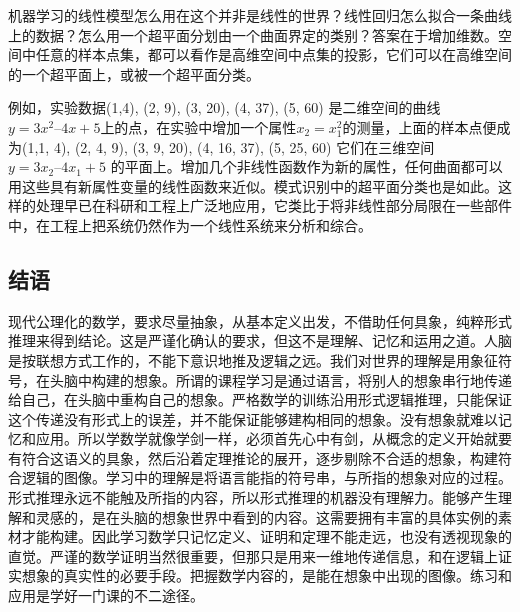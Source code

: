 机器学习的线性模型怎么用在这个并非是线性的世界？线性回归怎么拟合一条曲线上的数据？怎么用一个超平面分划由一个曲面界定的类别？答案在于增加维数。空间中任意的样本点集，都可以看作是高维空间中点集的投影，它们可以在高维空间的一个超平面上，或被一个超平面分类。

例如，实验数据(1,4), (2, 9), (3, 20), (4, 37), (5, 60) 是二维空间的曲线 $ y = 3x^2 – 4x + 5 $上的点，在实验中增加一个属性$ x_2 = x_1^2 $的测量，上面的样本点便成为(1,1, 4), (2, 4, 9), (3, 9, 20), (4, 16, 37), (5, 25, 60) 它们在三维空间$ y =3x_2 – 4x_1 + 5 $ 的平面上。增加几个非线性函数作为新的属性，任何曲面都可以用这些具有新属性变量的线性函数来近似。模式识别中的超平面分类也是如此。这样的处理早已在科研和工程上广泛地应用，它类比于将非线性部分局限在一些部件中，在工程上把系统仍然作为一个线性系统来分析和综合。

\subsection{结语}

现代公理化的数学，要求尽量抽象，从基本定义出发，不借助任何具象，纯粹形式推理来得到结论。这是严谨化确认的要求，但这不是理解、记忆和运用之道。人脑是按联想方式工作的，不能下意识地推及逻辑之远。我们对世界的理解是用象征符号，在头脑中构建的想象。所谓的课程学习是通过语言，将别人的想象串行地传递给自己，在头脑中重构自己的想象。严格数学的训练沿用形式逻辑推理，只能保证这个传递没有形式上的误差，并不能保证能够建构相同的想象。没有想象就难以记忆和应用。所以学数学就像学剑一样，必须首先心中有剑，从概念的定义开始就要有符合这语义的具象，然后沿着定理推论的展开，逐步剔除不合适的想象，构建符合逻辑的图像。学习中的理解是将语言能指的符号串，与所指的想象对应的过程。形式推理永远不能触及所指的内容，所以形式推理的机器没有理解力。能够产生理解和灵感的，是在头脑的想象世界中看到的内容。这需要拥有丰富的具体实例的素材才能构建。因此学习数学只记忆定义、证明和定理不能走远，也没有透视现象的直觉。严谨的数学证明当然很重要，但那只是用来一维地传递信息，和在逻辑上证实想象的真实性的必要手段。把握数学内容的，是能在想象中出现的图像。练习和应用是学好一门课的不二途径。